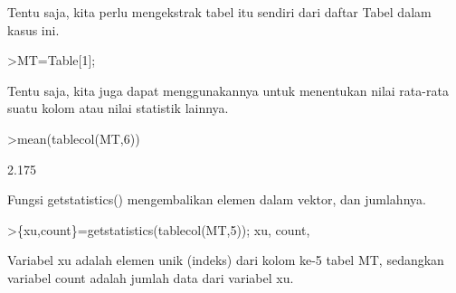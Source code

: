 \documentclass[a4paper,10pt]{article}
\begin{document}
\begin{eulernotebook}
\begin{eulercomment}
\begin{eulercomment}
\begin{eulercomment}
\begin{eulercomment}
\begin{eulercomment}
\begin{eulercomment}
\begin{eulercomment}
\begin{eulercomment}
\begin{eulercomment}
\begin{eulercomment}
\begin{eulercomment}
\begin{eulercomment}
\begin{eulercomment}
\begin{eulercomment}
\begin{eulercomment}
\begin{eulercomment}
\begin{eulercomment}
Tentu saja, kita perlu mengekstrak tabel itu sendiri dari daftar Tabel
dalam kasus ini.
\end{eulercomment}
\begin{eulerprompt}
>MT=Table[1];
\end{eulerprompt}
\begin{eulercomment}
Tentu saja, kita juga dapat menggunakannya untuk menentukan nilai
rata-rata suatu kolom atau nilai statistik lainnya.
\end{eulercomment}
\begin{eulerprompt}
>mean(tablecol(MT,6))
\end{eulerprompt}
\begin{euleroutput}
  2.175
\end{euleroutput}
\begin{eulercomment}
Fungsi getstatistics() mengembalikan elemen dalam vektor, dan
jumlahnya. 
\end{eulercomment}
\begin{eulerprompt}
>\{xu,count\}=getstatistics(tablecol(MT,5)); xu, count,
\end{eulerprompt}
\begin{euleroutput}
  [1,  5,  6]
  [2,  9,  6]
\end{euleroutput}
\begin{eulercomment}
Variabel xu adalah elemen unik (indeks) dari kolom ke-5 tabel MT,
sedangkan variabel count adalah jumlah data dari variabel xu.


\end{eulercomment}
\end{eulercomment}
\end{eulercomment}
\end{eulercomment}
\end{eulercomment}
\end{eulercomment}
\end{eulercomment}
\end{eulercomment}
\end{eulercomment}
\end{eulercomment}
\end{eulercomment}
\end{eulercomment}
\end{eulercomment}
\end{eulercomment}
\end{eulercomment}
\end{eulercomment}
\end{eulercomment}
\end{eulernotebook}
\end{document}
